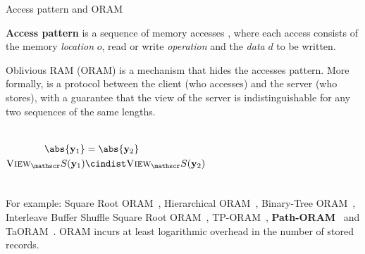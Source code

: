 	\begin{frame}{Access pattern and ORAM}

		\justifying%

		\textbf{Access pattern} is a sequence of memory accesses \oramProgram{}, where each access consists of the memory \emph{location} $o$, read \oramRead{} or write \oramWrite{} \emph{operation} and the \emph{data} $d$ to be written.

		Oblivious RAM (ORAM) is a mechanism that hides the accesses pattern.
		More formally, \oram{} is a protocol between the client \client{} (who accesses) and the server \server{} (who stores), with a guarantee that the view of the server is indistinguishable for any two sequences of the same lengths.

		\begin{columns}[T]

				\[
					\begin{split}
						\abs{\oramProgram_1}					& = \abs{\oramProgram_2}							\\
						\textsc{View}_\server (\oramProgram_1)	& \cindist \textsc{View}_\server (\oramProgram_2)
					\end{split}
				\]



		\end{columns}

		\vspace*{1ex}

		For example: Square Root ORAM~\cite{oram-theory}, Hierarchical ORAM~\cite{oram-original}, Binary-Tree ORAM~\cite{binary-tree-oram}, Interleave Buffer Shuffle Square Root ORAM~\cite{shortest-path-oram}, TP-ORAM~\cite{tp-oram}, \textbf{Path-ORAM}~\cite{path-oram} and TaORAM~\cite{taostore}.
		\alert{ORAM incurs at least logarithmic overhead in the number of stored records.~\cite{oram-original}}

	\end{frame}

